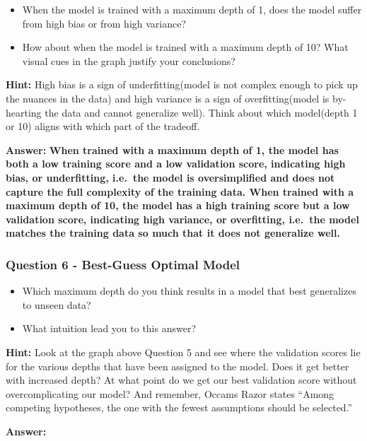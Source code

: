 \documentclass[11pt]{article}
\providecommand{\tightlist}{%
      \setlength{\itemsep}{0pt}\setlength{\parskip}{0pt}}
\begin{document}
\begin{itemize}
\tightlist
\item
  When the model is trained with a maximum depth of 1, does the model
  suffer from high bias or from high variance?
\item
  How about when the model is trained with a maximum depth of 10? What
  visual cues in the graph justify your conclusions?
\end{itemize}

\textbf{Hint:} High bias is a sign of underfitting(model is not complex
enough to pick up the nuances in the data) and high variance is a sign
of overfitting(model is by-hearting the data and cannot generalize
well). Think about which model(depth 1 or 10) aligns with which part of
the tradeoff.

    \textbf{Answer:} \textbf{When trained with a maximum depth of 1, the
model has both a low training score and a low validation score,
indicating high bias, or underfitting, i.e.~the model is oversimplified
and does not capture the full complexity of the training data. When
trained with a maximum depth of 10, the model has a high training score
but a low validation score, indicating high variance, or overfitting,
i.e.~the model matches the training data so much that it does not
generalize well.}

    \hypertarget{question-6---best-guess-optimal-model}{%
\subsubsection{Question 6 - Best-Guess Optimal
Model}\label{question-6---best-guess-optimal-model}}

\begin{itemize}
\tightlist
\item
  Which maximum depth do you think results in a model that best
  generalizes to unseen data?
\item
  What intuition lead you to this answer?
\end{itemize}

\textbf{Hint:} Look at the graph above Question 5 and see where the
validation scores lie for the various depths that have been assigned to
the model. Does it get better with increased depth? At what point do we
get our best validation score without overcomplicating our model? And
remember, Occams Razor states ``Among competing hypotheses, the one with
the fewest assumptions should be selected.''

    \textbf{Answer:}
\end{document}
